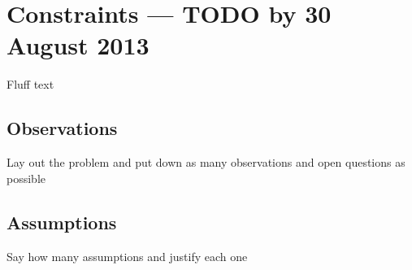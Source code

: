 \section{Constraints --- TODO by 30 August 2013}

\FIXME Fluff text

\subsection{Observations}

\FIXME Lay out the problem and put down as many observations and open questions
as possible

\subsection{Assumptions}

\FIXME Say how many assumptions and justify each one
